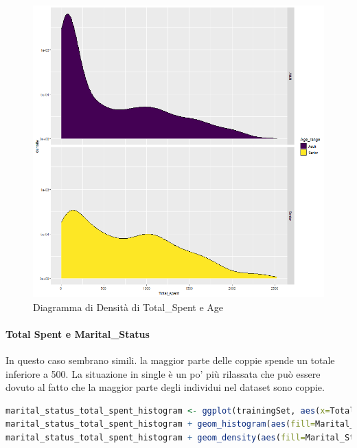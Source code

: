 \documentclass[letterpaper,11pt]{article}
\begin{document}
\begin{figure}[h]
\begin{minipage}[b]{0.4\textwidth}
    \includegraphics[width=\textwidth]{Img/EDA/EDA027.png}
    \caption{Diagramma di Densità di Total\_Spent e Age}
     \label{fig:DensitaTsAge}
  \end{minipage}
\end{figure}



\newpage
\paragraph{Total Spent e Marital\_Status}
In questo caso sembrano simili. la maggior parte delle coppie spende un totale inferiore a 500.
La situazione in single è un po' più rilassata che può essere dovuto al fatto che la maggior parte degli individui nel dataset sono coppie.

\begin{lstlisting}[language=R]
marital_status_total_spent_histogram <- ggplot(trainingSet, aes(x=Total_spent)) + facet_grid(Marital_Status~.) 
marital_status_total_spent_histogram + geom_histogram(aes(fill=Marital_Status), binwidth = 15, colour = "Black")
marital_status_total_spent_histogram + geom_density(aes(fill=Marital_Status), position = "Stack")
\end{lstlisting}
\end{document}
